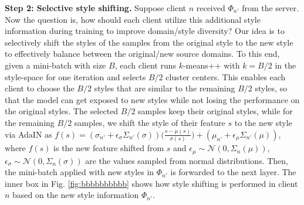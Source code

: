 \documentclass{article}
\theoremstyle{plain}
\theoremstyle{definition}
\theoremstyle{remark}
\begin{document}
\textbf{Step 2: Selective style shifting.} Suppose client $n$ received $\Phi_{n'}$ from the server. Now the question is, how should each client   utilize this   additional style information    during training   to improve domain/style diversity? Our idea  is to selectively shift the styles of the  samples from the original style  to the new style to effectively balance between the original/new source domains.  To this end, given a  mini-batch with size  $B$, each client runs $k$-means++  with $k=B/2$ in the style-space for one iteration and selects $B/2$ cluster centers. This enables each client to    choose the  $B/2$ styles that are similar  to the remaining $B/2$ styles, so that the model can get exposed to new styles while not losing the performance on the original styles.
  The selected $B/2$ samples keep their original styles, while for the remaining $B/2$ samples, we shift the style  of their feature $s$ to the new style via AdaIN \cite{huang2017arbitrary} as  
$f(s)=(\sigma_{n'} + \epsilon_{\sigma}\Sigma_{n'}(\sigma))\Big(\frac{s-\mu(s)}{\sigma(s)}\Big)+(\mu_{n'} + \epsilon_{\mu}\Sigma_{n'}(\mu))$,
where $f(s)$ is the new feature shifted from $s$ and $\epsilon_{\mu}\sim \mathcal{N}(0,\Sigma_n(\mu))$, $\epsilon_{\sigma}\sim \mathcal{N}(0,\Sigma_n(\sigma))$ are   the values sampled from   normal distributions.    Then, the mini-batch applied with new styles in  $\Phi_{n'}$ is forwarded to the next layer.  The inner box in Fig. \ref{fig:bbbbbbbbbb}    shows  how style shifting  is performed in client $n$ based on the  new style information  $\Phi_{n'}$.         

\end{document}
